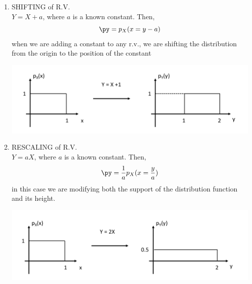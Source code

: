 \begin{enumerate}
    \item SHIFTING of R.V. \\
    $ Y = X+a$, where $a$ is a known constant. Then,
    $$ \py =  p_X(x = y-a) $$
    when we are adding a constant to any r.v., we are shifting the distribution from the origin to the position of the constant
    
    \begin{center}
    \includegraphics[scale=.3]{Figures/Fig15.png}
    \end{center}
    
    
    \item RESCALING of R.V.\\
    $ Y = aX$, where $a$ is a known constant. Then,
    $$ \py =  \frac{1}{a} p_X(x = \frac{y}{a}) $$
    in this case we are modifying both the support of the distribution function and its height.
    
    \begin{center}
    \includegraphics[scale=.3]{Figures/Fig16.png}
    \end{center}
    
\end{enumerate}

